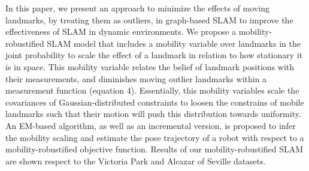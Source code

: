In this paper, we present an approach to minimize the effects of
moving landmarks, by treating them as outliers, in graph-based SLAM to
improve the effectiveness of SLAM in dynamic environments.  We
propose a mobility-robustified SLAM model that includes a mobility
variable over landmarks in the joint probability to scale the effect
of a landmark in relation to how stationary it is in space.  This
mobility variable relates the belief of landmark positions with their
measurements, and diminishes moving outlier landmarks within a
measurement function (equation 4).
Essentially, this mobility variables scale the covariances
of Gaussian-distributed constraints to loosen the constrains of mobile landmarks such that their motion will push this distribution towards uniformity.
  An EM-based algorithm, as well as
an incremental version, is proposed to infer the mobility scaling
and estimate the pose trajectory of a robot with respect to a
mobility-robustified objective function. Results of our
mobility-robustified SLAM are shown respect to the
Victoria Park \cite{isam} and Alcazar of Seville \cite{iros14-frog} datasets.
